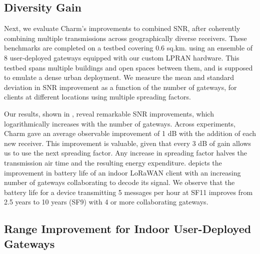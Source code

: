 \subsection{Diversity Gain}
\label{sec:diversity-gain-eval}

Next, we evaluate Charm's improvements to combined SNR, after coherently
combining multiple transmissions across geographically diverse receivers.
These benchmarks are completed on a testbed covering 0.6 sq.km. using an
ensemble of 8 user-deployed gateways equipped with our custom LPRAN hardware.
This testbed spans multiple buildings and open spaces between them, and is
supposed to emulate a dense urban deployment. We measure the mean and standard
deviation in SNR improvement as a function of the number of gateways, for
clients at different locations using multiple spreading factors.

Our results, shown in , reveal remarkable SNR improvements, which
logarithmically increases with the number of gateways. Across experiments, Charm gave an
average observable improvement of 1 dB with the addition of each new receiver.
This improvement is valuable, given that every 3 dB of gain allows us to use
the next spreading factor. Any increase in spreading factor halves the
transmission air time and the resulting energy expenditure.
 depicts the improvement in battery life of an
indoor LoRaWAN client with an increasing number of gateways collaborating to
decode its signal. We observe that the battery life for a device transmitting
5 messages per hour at SF11 improves from 2.5 years to 10 years (SF9) with 4
or more collaborating gateways.


\subsection{Range Improvement for Indoor User-Deployed Gateways}



